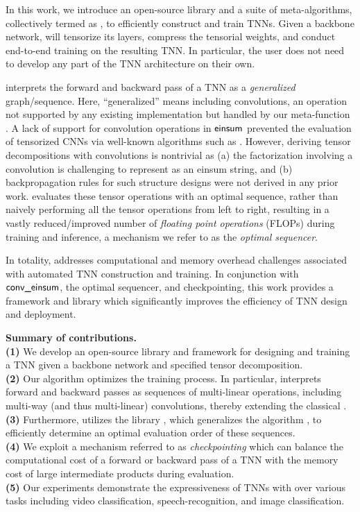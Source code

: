 In this work, we introduce an open-source library and a suite of meta-algorithms, collectively termed as \autotnn, to efficiently construct and train TNNs. Given a backbone network, \autotnn will tensorize its layers, compress the tensorial weights, and conduct end-to-end training on the resulting TNN. In particular, the user does not need to develop any part of the TNN architecture on their own. 

\autotnn interprets the forward and backward pass of a TNN as a \textit{generalized} \einsum graph/sequence. Here, ``generalized'' means including convolutions, an operation not supported by any existing \einsum implementation but handled by our meta-function \conveinsum. A lack of support for convolution operations in $\textsf{einsum}$ prevented the evaluation of tensorized CNNs via well-known algorithms such as \netcon. However, deriving tensor decompositions with convolutions is nontrivial as (a) the factorization involving a convolution is challenging to represent as an einsum string, and (b) backpropagation rules for such structure designs were not derived in any prior work. \conveinsum evaluates these tensor operations with an optimal sequence, rather than naively performing all the tensor operations from left to right, resulting in a vastly reduced/improved number of \emph{floating point operations} (FLOPs) during training and inference, a mechanism we refer to as the \textit{optimal sequencer}.

In totality, \autotnn addresses computational and memory overhead challenges associated with automated TNN construction and training. In conjunction with $\textsf{conv\_einsum}$, the optimal sequencer, and checkpointing, this work provides a framework and library which significantly improves the efficiency of TNN design and deployment.

\textbf{Summary of contributions.} \\
\textbf{(1)} We develop an open-source library \autotnn and framework for designing and training a TNN given a backbone network and specified tensor decomposition. \\
\textbf{(2)} Our algorithm \conveinsum optimizes the training process. In particular, \conveinsum interprets forward and backward passes as sequences of multi-linear operations, including multi-way (and thus multi-linear) convolutions, thereby extending the classical \einsum. \\
\textbf{(3)} Furthermore, \conveinsum utilizes the library \opteinsum \citep{daniel2018opt}, which generalizes the \netcon algorithm \citep{pfeifer2014faster}, to efficiently determine an optimal evaluation order of these sequences. \\
\textbf{(4)}  We exploit a mechanism referred to as \textit{checkpointing} \citep{chen2016training} which can balance the computational cost of a forward or backward pass of a TNN with the memory cost of large intermediate products during evaluation.\\
\textbf{(5)}  Our experiments demonstrate the expressiveness of TNNs with \autotnn over various tasks including video classification, speech-recognition, and image classification. 

